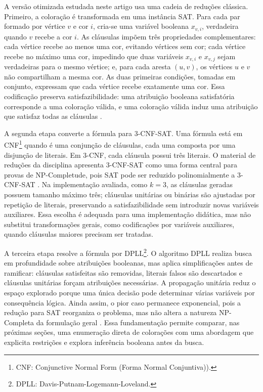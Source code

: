 A versão otimizada estudada neste artigo usa uma cadeia de reduções clássica. Primeiro, a coloração é transformada em uma instância SAT. Para cada par formado por vértice $v$ e cor $i$, cria-se uma variável booleana $x_{v,i}$, verdadeira quando $v$ recebe a cor $i$. As cláusulas impõem três propriedades complementares: cada vértice recebe ao menos uma cor, evitando vértices sem cor; cada vértice recebe no máximo uma cor, impedindo que duas variáveis $x_{v,i}$ e $x_{v,j}$ sejam verdadeiras para o mesmo vértice; e, para cada aresta $(u,v)$, os vértices $u$ e $v$ não compartilham a mesma cor. As duas primeiras condições, tomadas em conjunto, expressam que cada vértice recebe exatamente uma cor. Essa codificação preserva satisfazibilidade: uma atribuição booleana satisfatória corresponde a uma coloração válida, e uma coloração válida induz uma atribuição que satisfaz todas as cláusulas \parencite{dalton-reisUDESC_PAA_TFMainipynb}.

A segunda etapa converte a fórmula para 3-CNF-SAT. Uma fórmula está em CNF\footnote{CNF: Conjunctive Normal Form (Forma Normal Conjuntiva)).} quando é uma conjunção de cláusulas, cada uma composta por uma disjunção de literais. Em 3-CNF, cada cláusula possui três literais. O material de reduções da disciplina apresenta 3-CNF-SAT como uma forma central para provas de NP-Completude, pois SAT pode ser reduzido polinomialmente a 3-CNF-SAT \parencite{Silva2026PAA13}. Na implementação avaliada, como $k=3$, as cláusulas geradas possuem tamanho máximo três; cláusulas unitárias ou binárias são ajustadas por repetição de literais, preservando a satisfazibilidade sem introduzir novas variáveis auxiliares. Essa escolha é adequada para uma implementação didática, mas não substitui transformações gerais, como codificações por variáveis auxiliares, quando cláusulas maiores precisam ser tratadas.

A terceira etapa resolve a fórmula por DPLL\footnote{DPLL: Davis-Putnam-Logemann-Loveland.}. O algoritmo DPLL realiza busca em profundidade sobre atribuições booleanas, mas aplica simplificações antes de ramificar: cláusulas satisfeitas são removidas, literais falsos são descartados e cláusulas unitárias forçam atribuições necessárias. A propagação unitária reduz o espaço explorado porque uma única decisão pode determinar várias variáveis por consequência lógica. Ainda assim, o pior caso permanece exponencial, pois a redução para SAT reorganiza o problema, mas não altera a natureza NP-Completa da formulação geral \parencite{cormen2014desmistificando,cormen2024algoritmos}. Essa fundamentação permite comparar, nas próximas seções, uma enumeração direta de colorações com uma abordagem que explicita restrições e explora inferência booleana antes da busca.

